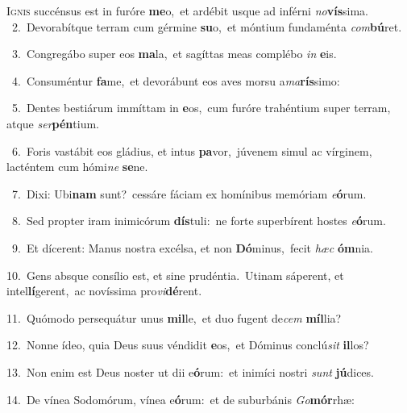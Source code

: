 \lettrine{\initial\textcolor{\initialcolor}{I}}{gnis} succénsus est in furóre \textbf{me}\-o,~\star et ardébit usque ad inférni \textit{no}\-\textbf{vís}sima.\\
{\numbfont\textcolor{\numbcolor}{~2.}}~Devorabítque terram cum gérmine \textbf{su}\-o,~\star et móntium fundaménta \textit{com}\-\textbf{bú}ret.\par
{\numbfont\textcolor{\numbcolor}{~3.}}~Congregábo super eos \textbf{ma}\-la,~\star et sagíttas meas complébo \textit{in} \textbf{e}\-is.\par
{\numbfont\textcolor{\numbcolor}{~4.}}~Consuméntur \textbf{fa}\-me,~\star et devorábunt eos aves morsu a\-\textit{ma}\-\textbf{rís}simo:\par
{\numbfont\textcolor{\numbcolor}{~5.}}~Dentes bestiárum immíttam in \textbf{e}\-os,~\star cum furóre trahéntium super terram, atque \textit{ser}\-\textbf{pén}tium.\par
{\numbfont\textcolor{\numbcolor}{~6.}}~Foris vastábit eos gládius, et intus \textbf{pa}\-vor,~\star júvenem simul ac vírginem, lacténtem cum hómi\textit{ne} \textbf{se}\-ne.\par
{\numbfont\textcolor{\numbcolor}{~7.}}~Dixi: Ubi\textbf{nam} sunt?~\star cessáre fáciam ex homínibus memóriam \textit{e}\-\textbf{ó}rum.\par
{\numbfont\textcolor{\numbcolor}{~8.}}~Sed propter iram inimicórum \textbf{dís}\-tuli:~\star ne forte superbírent hostes \textit{e}\-\textbf{ó}rum.\par
{\numbfont\textcolor{\numbcolor}{~9.}}~Et dícerent: Manus nostra excélsa, et non \textbf{Dó}\-minus,~\star fecit \textit{hæc} \textbf{óm}\-nia.\par
{\numbfont\textcolor{\numbcolor}{10.}}~Gens absque consílio est, et sine prudéntia.~\dagger Utinam sáperent, et intel\-\textbf{lí}\-gerent,~\star ac novíssima pro\-\textit{vi}\-\textbf{dé}rent.\par
{\numbfont\textcolor{\numbcolor}{11.}}~Quómodo persequátur unus \textbf{mil}\-le,~\star et duo fugent de\textit{cem} \textbf{míl}\-lia?\par
{\numbfont\textcolor{\numbcolor}{12.}}~Nonne ídeo, quia Deus suus véndidit \textbf{e}\-os,~\star et Dóminus conclú\textit{sit} \textbf{il}\-los?\par
{\numbfont\textcolor{\numbcolor}{13.}}~Non enim est Deus noster ut dii e\-\textbf{ó}\-rum:~\star et inimíci nostri \textit{sunt} \textbf{jú}\-dices.\par
{\numbfont\textcolor{\numbcolor}{14.}}~De vínea Sodomórum, vínea e\-\textbf{ó}\-rum:~\star et de suburbánis \textit{Go}\-\textbf{mór}rhæ:\par
